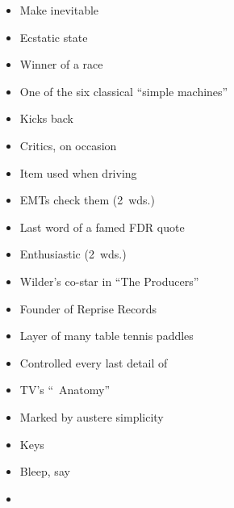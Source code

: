 {    \begin{itemize}
      \item
        Make inevitable
      \item
        Ecstatic state
    \end{itemize}
  \item
    \begin{itemize}
      \item
        Winner of a race
      \item
        One of the six classical ``simple machines''
    \end{itemize}
  \item
    \begin{itemize}
      \item
        Kicks back
      \item
        Critics, on occasion
    \end{itemize}
  \item
    \begin{itemize}
      \item
        Item used when driving
      \item
        EMTs check them (2~wds.)
    \end{itemize}
  \item
    \begin{itemize}
      \item
        Last word of a famed FDR quote
      \item
        Enthusiastic (2~wds.)
    \end{itemize}
  \item
    \begin{itemize}
      \item
        Wilder's co-star in ``The Producers''
      \item
        Founder of Reprise Records
    \end{itemize}
}{%
  \item
    \begin{itemize}
      \item
        Layer of many table tennis paddles
      \item
        Controlled every last detail of
      \item
        TV's ``\blank\ Anatomy''
      \item
        Marked by austere simplicity
      \item
        Keys
      \item
        Bleep, say
      \item

\end{itemize}}
